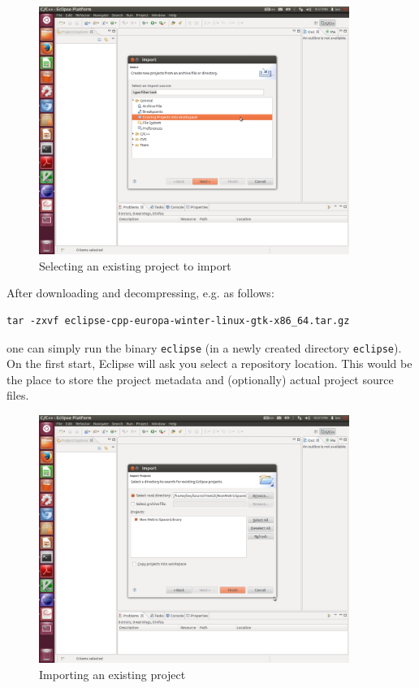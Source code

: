 \documentclass[runningheads,a4paper]{llncs}
\newcommand{\ttt}[1]{\texttt{#1}}
\begin{document}
{\begin{figure}
\caption{\label{FigEclipse1}Selecting an existing project to import}
\includegraphics[width=0.9\textwidth]{figures/Eclipse1.pdf}
\end{figure}

After downloading and decompressing, e.g. as follows:
\begin{verbatim}
tar -zxvf eclipse-cpp-europa-winter-linux-gtk-x86_64.tar.gz
\end{verbatim}
one can simply run the binary \ttt{eclipse} (in a
newly created directory \ttt{eclipse}).
On the first start, Eclipse will ask you select a repository location.
This would be the place to store the project metadata and (optionally)
actual project source files.

\begin{figure}
\caption{\label{FigEclipse2}Importing an existing project}
\includegraphics[width=0.9\textwidth]{figures/Eclipse2.pdf}
\end{figure}

}
\end{document}
